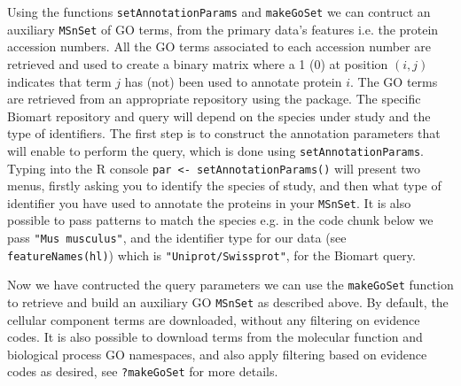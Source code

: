 Using the functions \texttt{setAnnotationParams} and
\texttt{makeGoSet} we can contruct an auxiliary \texttt{MSnSet} of GO
terms, from the primary data's features i.e. the protein accession
numbers. All the GO terms associated to each accession number are
retrieved and used to create a binary matrix where a 1 (0) at position
$(i, j)$ indicates that term $j$ has (not) been used to annotate
protein $i$. The GO terms are retrieved from an appropriate repository
using the  package. The specific Biomart repository
and query will depend on the species under study and the type of
identifiers. The first step is to construct the annotation parameters
that will enable to perform the query, which is done using
\texttt{setAnnotationParams}. Typing into the R console \texttt{par <-
  setAnnotationParams()} will present two menus, firstly asking you to
identify the species of study, and then what type of identifier you
have used to annotate the proteins in your \texttt{MSnSet}. It is also
possible to pass patterns to match the species e.g. in the code chunk
below we pass \texttt{"Mus musculus"}, and the identifier type for our
data (see \texttt{featureNames(hl)}) which is
\texttt{"Uniprot/Swissprot"}, for the Biomart query.

\begin{knitrout}
\color{fgcolor}\begin{kframe}
\begin{alltt}
 \hlkwb{<-} \hlstd{(} \hlstd{=} \hlstd{(}\hlstd{,} \hlstd{))}
\end{alltt}
\end{kframe}
\end{knitrout}

Now we have contructed the query parameters we can use the
\texttt{makeGoSet} function to retrieve and build an auxiliary GO
\texttt{MSnSet} as described above. By default, the cellular component
terms are downloaded, without any filtering on evidence codes. It is
also possible to download terms from the molecular function and
biological process GO namespaces, and also apply filtering based on
evidence codes as desired, see \texttt{?makeGoSet} for more details.

\begin{knitrout}
\color{fgcolor}\begin{kframe}
\begin{alltt}
 \hlkwb{<-}     \hlstd{=} \hlstd{)}
\end{alltt}
\end{kframe}
\end{knitrout}

